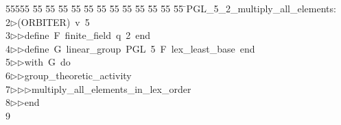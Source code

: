 %
%
\begin{tabbing}
55555 \= 55 \= 55 \= 55 \= 55 \= 55 \= 55 \= 55 \= 55 \= 55 \= 55 \= 55 \= 55 \= \>PGL\_5\_2\_multiply\_all\_elements:\\[0pt]
2\>$\triangleright$\>(ORBITER)\ v\ 5\ \\[0pt]
3\>$\triangleright$\>$\triangleright$\>define\ F\ finite\_field\ q\ 2\ end\ \\[0pt]
4\>$\triangleright$\>$\triangleright$\>define\ G\ linear\_group\ PGL\ 5\ F\ lex\_least\_base\ end\ \\[0pt]
5\>$\triangleright$\>$\triangleright$\>with\ G\ do\ \\[0pt]
6\>$\triangleright$\>$\triangleright$\>group\_theoretic\_activity\ \\[0pt]
7\>$\triangleright$\>$\triangleright$\>$\triangleright$\>multiply\_all\_elements\_in\_lex\_order\ \\[0pt]
8\>$\triangleright$\>$\triangleright$\>end\\[0pt]
9\>\end{tabbing}
